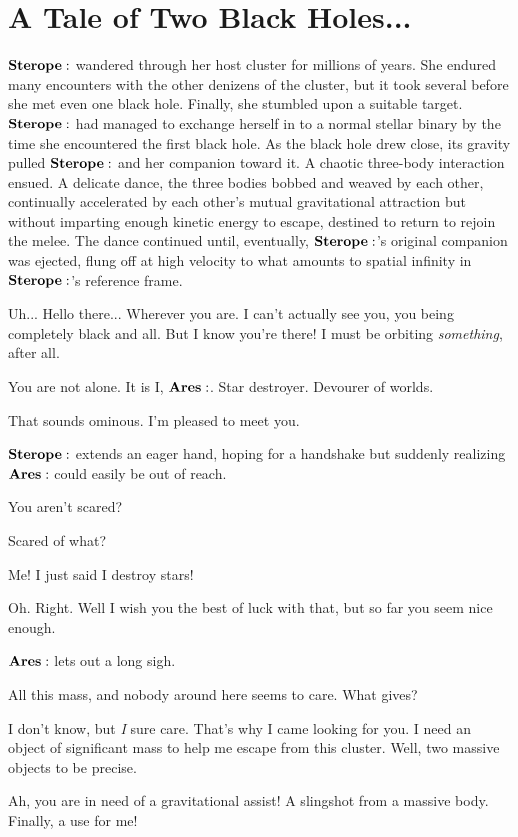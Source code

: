 \section{A Tale of Two Black Holes...}

$\Sterope$ wandered through her host cluster for millions of years.  She endured many encounters with the other denizens of the cluster, but it took several before she met even one black hole.  Finally, she stumbled upon a suitable target.  $\Sterope$ had managed to exchange herself in to a normal stellar binary by the time she encountered the first black hole.  As the black hole drew close, its gravity pulled $\Sterope$ and her companion toward it.  A chaotic three-body interaction ensued.  A delicate dance, the three bodies bobbed and weaved by each other, continually accelerated by each other's mutual gravitational attraction but without imparting enough kinetic energy to escape, destined to return to rejoin the melee.  The dance continued until, eventually, $\Sterope$'s original companion was ejected, flung off at high velocity to what amounts to spatial infinity in $\Sterope$'s reference frame.

\Sterope Uh... Hello there... Wherever you are.  I can't actually see you, you being completely black and all.  But I know you're there!  I must be orbiting \textit{something}, after all.

\Ares You are not alone.  It is I, $\Ares$.  Star destroyer.  Devourer of worlds.

\Sterope That sounds ominous.  I'm pleased to meet you.

$\Sterope$ extends an eager hand, hoping for a handshake but suddenly realizing $\Ares$ could easily be out of reach.

\Ares You aren't scared?

\Sterope Scared of what?

\Ares Me!  I just said I destroy stars!

\Sterope Oh.  Right.  Well I wish you the best of luck with that, but so far you seem nice enough.

$\Ares$ lets out a long sigh.

\Ares All this mass, and nobody around here seems to care.  What gives?

\Sterope I don't know, but \textit{I} sure care.  That's why I came looking for you.  I need an object of significant mass to help me escape from this cluster.  Well, two massive objects to be precise.  

\Ares Ah, you are in need of a gravitational assist!  A slingshot from a massive body.  Finally, a use for me!

